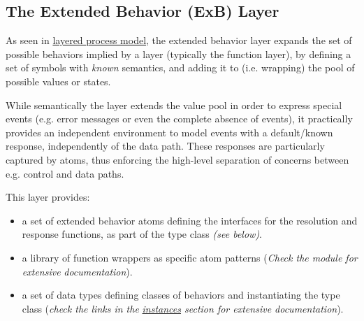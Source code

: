 \subsection{The Extended Behavior (ExB) Layer}
As seen in \hyperref[layered-model]{layered process model}, the extended
 behavior layer expands the set of possible behaviors implied by a
 layer (typically the function layer), by defining a set of
 symbols with \emph{known} semantics, and adding it to (i.e. wrapping)
 the pool of possible values or states.\par
While semantically the  layer extends the value pool in
 order to express special events (e.g. error messages or even the
 complete absence of events), it practically provides an
 independent environment to model events with a default/known
 response, independently of the data path. These responses are
 particularly captured by atoms, thus enforcing the high-level
 separation of concerns between e.g. control and data paths.\par
This layer provides:\par
\begin{itemize}
\item
a set of extended behavior atoms defining the interfaces for
 the resolution and response functions, as part of the  type
 class \emph{(see below)}.\par

\item
a library of function wrappers as specific atom patterns
 (\emph{Check the  module for extensive}
 \emph{documentation}).\par

\item
a set of data types defining classes of behaviors and
 instantiating the  type class (\emph{check the links in the}
 \emph{\hyperref[section.i:ExB]{instances} section for extensive documentation}).\par

\end{itemize}


